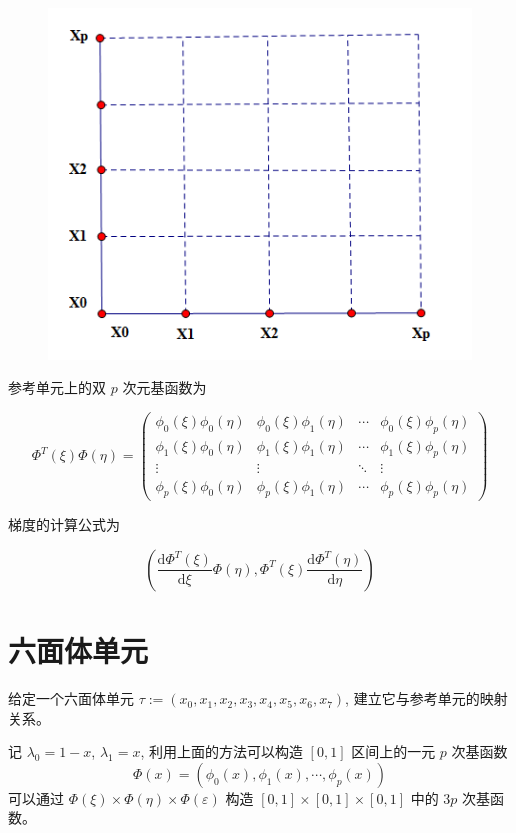 \documentclass[12pt,a4paper]{article}
\begin{document}
\begin{figure}[H]
\centering
\includegraphics[scale=0.7]{./figures/6.png}
\caption{}
\end{figure}


参考单元上的双 $p$ 次元基函数为 

$$
\Phi^T(\xi)\Phi(\eta) =
\begin{pmatrix}
\phi_0(\xi)\phi_0(\eta) & \phi_0(\xi)\phi_1(\eta) & \cdots & \phi_0(\xi)\phi_p(\eta)\\
\phi_1(\xi)\phi_0(\eta) & \phi_1(\xi)\phi_1(\eta) & \cdots & \phi_1(\xi)\phi_p(\eta)\\
\vdots & \vdots & \ddots & \vdots \\
\phi_p(\xi)\phi_0(\eta) & \phi_p(\xi)\phi_1(\eta) & \cdots & \phi_p(\xi)\phi_p(\eta)
\end{pmatrix}
$$

梯度的计算公式为

$$
\left(\frac{\mathrm d \Phi^T(\xi)}{\mathrm d \xi}\Phi(\eta), \Phi^T(\xi)\frac{\mathrm d \Phi^T(\eta)}{\mathrm d\eta}\right)
$$

\section{六面体单元}
给定一个六面体单元 $\tau := (x_0, x_1, x_2, x_3, x_4, x_5, x_6, x_7)$, 建立它与参考单元的映射关系。


记 $\lambda_0 = 1-x$, $\lambda_1 = x$, 利用上面的方法可以构造 $[0, 1]$ 区间上的一元 $p$ 次基函数
$$
\Phi(x) = (\phi_0(x), \phi_1(x), \cdots, \phi_{p}(x))
$$
可以通过 $\Phi(\xi) \times \Phi(\eta)\times \Phi(\varepsilon)$ 构造 $[0, 1] \times [0, 1] \times [0, 1]$ 中的 $3p$ 次基函数。
\end{document}

